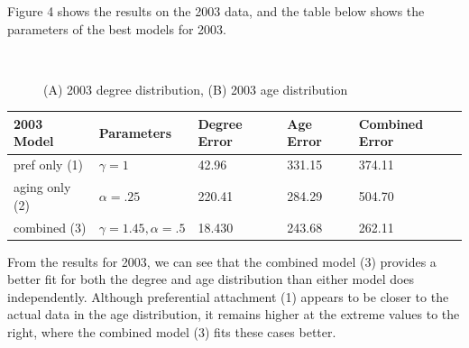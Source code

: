 \documentclass[11pt]{amsart}
\begin{document}
Figure 4 shows the results on the 2003 data, and the table below shows the parameters of the best models for 2003. 

\begin{figure}
	\centering
	 \\
\caption{(A) 2003 degree distribution, (B) 2003 age distribution}
\end{figure}

\vspace{10pt}
\begin{tabular}{| l | l | l | l | l |}
 \hline
2003 Model & Parameters & Degree Error & Age Error & Combined Error \\ \hline
pref only (1) & $\gamma = 1$ & 42.96 & 331.15 & 374.11 \\ \hline
aging only (2) & $\alpha = .25$ & 220.41 & 284.29 & 504.70 \\ \hline
combined (3) & $\gamma = 1.45, \alpha=.5$ & 18.430 & 243.68 & 262.11 \\ \hline
\end{tabular}
\vspace{10pt}

From the results for 2003, we can see that the combined model (3) provides a better fit for both the degree and age distribution than either model does independently. Although preferential attachment (1) appears to be closer to the actual data in the age distribution, it remains higher at the extreme values to the right, where the combined model (3) fits these cases better.
\end{document}
